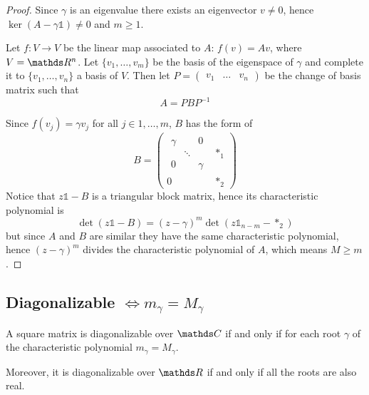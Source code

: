 \documentclass[12pt]{extarticle}
\numberwithin{equation}{section}
\begin{document}
\begin{proof}
    Since $\gamma$ is an eigenvalue there exists an eigenvector $v \neq 0$,
    hence $\ker (A - \gamma \mathds{1}) \ne 0$ and $m \geq 1$.

    Let $f: V \to V$ be the linear map associated to $A$: $f(v) = A v$, where $V = \R^n$.
    Let $\{v_1, \dots, v_m\}$ be the basis of the eigenspace of $\gamma$
    and complete it to $\{v_1, \dots, v_n\}$ a basis of $V$.
    Then let $P = \begin{pmatrix}v_1 & \dots & v_n\end{pmatrix}$ be the change of basis matrix
    such that
    \begin{equation}
        A = P B P^{-1}
    \end{equation}

    Since $f(v_j) = \gamma v_j$ for all $j \in 1, \dots, m$, $B$ has the form of
    \begin{equation}
        B = \left(\begin{array}{c|c}
            \begin{matrix}
                \gamma &        & 0      \\
                       & \ddots &        \\
                0      &        & \gamma
            \end{matrix} & *_1          \\
            \hline
            0                           & *_2
        \end{array}
        \right)
    \end{equation}
    Notice that $z \mathds{1} - B$ is a triangular block matrix, hence its characteristic polynomial is
    \begin{equation}
        \det(z \mathds 1 - B) = (z-\gamma)^m \det(z \mathds 1_{n-m} - *_2)
    \end{equation}
    but since $A$ and $B$ are similar they have the same characteristic polynomial,
    hence $(z-\gamma)^m$ divides the characteristic polynomial of $A$,
    which means $M \geq m$.
\end{proof}

\subsection{Diagonalizable \texorpdfstring{$\iff m_\gamma = M_\gamma$}{iff geometric equals to algebraic}}

\begin{theorem}{}{}
    A square matrix is diagonalizable over $\C$ if and only if
    for each root $\gamma$ of the characteristic polynomial
    $m_\gamma = M_\gamma$.

    Moreover, it is diagonalizable over $\R$ if and only if all the roots are also real.
\end{theorem}
\end{document}
